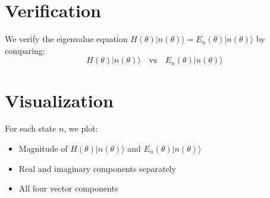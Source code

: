 \documentclass{article}
\begin{document}
\section{Verification}
We verify the eigenvalue equation $H(\theta)|n(\theta)\rangle = E_n(\theta)|n(\theta)\rangle$ by comparing:
\begin{equation}
H(\theta)|n(\theta)\rangle \quad \text{vs} \quad E_n(\theta)|n(\theta)\rangle
\end{equation}

\section{Visualization}
For each state $n$, we plot:
\begin{itemize}
\item Magnitude of $H(\theta)|n(\theta)\rangle$ and $E_n(\theta)|n(\theta)\rangle$
\item Real and imaginary components separately
\item All four vector components
\end{itemize}
\end{document}
